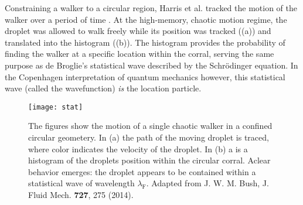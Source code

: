 





Constraining a walker to a circular region, Harris et al. tracked the motion of the walker over a period of time \cite{Harris2013}. At the high-memory, chaotic motion regime, the droplet was allowed to walk freely while its position was tracked ((a)) and translated into the histogram ((b)). The histogram provides the probability of finding the walker at a specific location within the corral, serving the same purpose as de Broglie's statistical wave described by the Schr\"{o}dinger equation. In the Copenhagen interpretation of quantum mechanics however, this statistical wave (called the wavefunction) \textit{is} the location particle. 

\begin{figure}[h]
	       \centering
	    \texttt{[image: stat]}
	     \caption{ The figures show the motion of a single chaotic walker in a confined circular geometery. In (a) the path of the moving droplet is traced, where color indicates the velocity of the droplet. In (b) a is a histogram of the droplets position within the circular corral. Aclear behavior emerges: the droplet appears to be contained within a statistical wave of wavelength $\lambda_\mathrm{F}$. Adapted from J. W. M. Bush, J. Fluid Mech. \textbf{727}, 275 (2014).
	     }
	 \label{stat}
	\end{figure}



